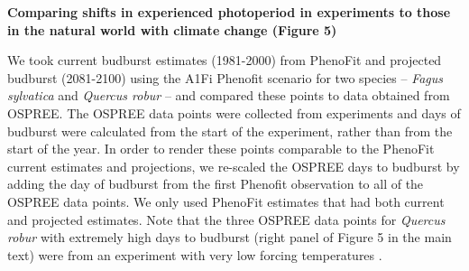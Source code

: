 \documentclass{article}
\begin{document}
\par \textbf{Comparing shifts in experienced photoperiod in experiments to those in the natural world with climate change (Figure 5)}
\par We took current budburst estimates (1981-2000) from PhenoFit \citep{duputie2015} and projected budburst (2081-2100) using the A1Fi Phenofit scenario for two species -- \textit{Fagus sylvatica} and \textit{Quercus robur} -- and compared these points to data obtained from OSPREE. The OSPREE data points were collected from experiments and days of budburst were calculated from the start of the experiment, rather than from the start of the year. In order to render these points comparable to the PhenoFit current estimates and projections, we re-scaled the OSPREE days to budburst by adding the day of budburst from the first Phenofit observation to all of the OSPREE data points. We only used PhenoFit estimates that had both current and projected estimates. Note that the three OSPREE data points for \textit{Quercus robur} with extremely high days to budburst (right panel of Figure 5 in the main text) were from an experiment with very low forcing temperatures \citep[][3.8-5.7$^{\circ}$]{Morin:2010aa}. 


\end{document}
